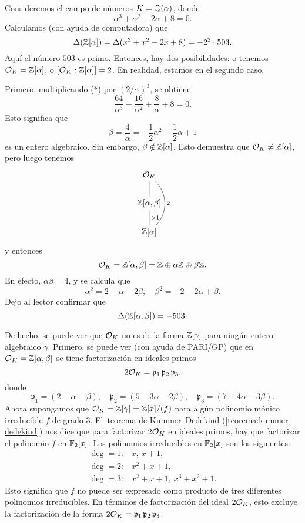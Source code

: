 \begin{ejemplo}[Dedekind]
  Consideremos el campo de números $K = \mathbb{Q} (\alpha)$, donde
  \[ \tag{*} \alpha^3 + \alpha^2 - 2\alpha + 8 = 0. \]
  Calculamos (con ayuda de computadora) que
  $$\Delta (\mathbb{Z} [\alpha]) = \Delta (x^3 + x^2 - 2x + 8) = -2^2 \cdot 503.$$
  Aquí el número $503$ es primo. Entonces, hay dos posibilidades: o tenemos
  $\mathcal{O}_K = \mathbb{Z} [\alpha]$, o $[\mathcal{O}_K : \mathbb{Z} [\alpha]] = 2$.
  En realidad, estamos en el segundo caso.

  Primero, multiplicando (*) por $(2/\alpha)^3$, se obtiene
  $$\frac{64}{\alpha^3} - \frac{16}{\alpha^2} + \frac{8}{\alpha} + 8 = 0.$$
  Esto significa que
  $$\beta = \frac{4}{\alpha} = -\frac{1}{2} \alpha^2 - \frac{1}{2} \alpha + 1$$
  es un entero algebraico. Sin embargo, $\beta \notin \mathbb{Z} [\alpha]$. Esto
  demuestra que $\mathcal{O}_K \ne \mathbb{Z} [\alpha]$, pero luego tenemos
  \[ \begin{tikzcd}
    \O_K \ar[-]{d}\ar[-,bend left=45]{dd}{2} \\
    \ZZ [\alpha,\beta] \ar[-]{d}{> 1} \\
    \ZZ [\alpha]
  \end{tikzcd} \]
  y entonces
  $$\mathcal{O}_K = \mathbb{Z} [\alpha,\beta] = \mathbb{Z} \oplus \alpha\mathbb{Z} \oplus \beta\mathbb{Z}.$$
  En efecto, $\alpha\beta = 4$, y se calcula que
  $$\alpha^2 = 2 - \alpha - 2\beta, \quad \beta^2 = -2 - 2\alpha + \beta.$$
  Dejo al lector confirmar que
  $$\Delta (\mathbb{Z} [\alpha,\beta]) = -503.$$

  De hecho, se puede ver que $\mathcal{O}_K$ no es de la forma $\mathbb{Z} [\gamma]$ para ningún
  entero algebraico $\gamma$. Primero, se puede ver (con ayuda de PARI/GP)
  que en $\mathcal{O}_K = \mathbb{Z} [\alpha,\beta]$ se tiene factorización en ideales primos
  $$2\mathcal{O}_K = \mathfrak{p}_1 \, \mathfrak{p}_2 \, \mathfrak{p}_3,$$
  donde
  \[ \mathfrak{p}_1 = (2 - \alpha - \beta), \quad
     \mathfrak{p}_2 = (5 - 3\alpha - 2\beta), \quad
     \mathfrak{p}_3 = (7 - 4\alpha - 3\beta). \]
  Ahora supongamos que $\mathcal{O}_K = \mathbb{Z} [\gamma] = \mathbb{Z} [x] / (f)$ para algún
  polinomio mónico irreducible $f$ de grado $3$. El~teorema de Kummer--Dedekind
  (\ref{teorema:kummer-dedekind}) nos dice que para factorizar $2\mathcal{O}_K$ en
  ideales primos, hay que factorizar el polinomio $f$ en $\mathbb{F}_2 [x]$. Los
  polinomios irreducibles en $\mathbb{F}_2 [x]$ son los siguientes:
  \begin{align*}
    \deg = 1\colon & x, ~ x+1, \\
    \deg = 2\colon & x^2 + x + 1, \\
    \deg = 3\colon & x^2 + x + 1, ~ x^3 + x^2 + 1.
  \end{align*}
  Esto significa que $f$ no puede ser expresado como producto de tres diferentes
  polinomios irreducibles. En términos de factorización del ideal $2\mathcal{O}_K$, esto
  excluye la factorización de la forma
  $2\mathcal{O}_K = \mathfrak{p}_1 \, \mathfrak{p}_2 \, \mathfrak{p}_3$.
\end{ejemplo}

